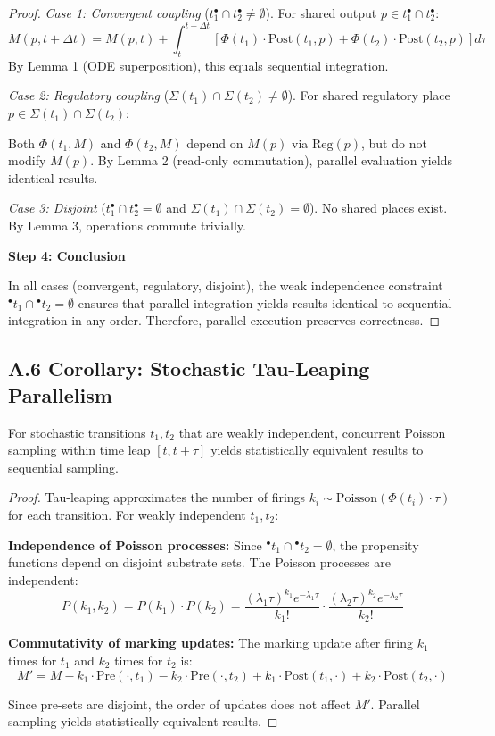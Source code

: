 \begin{proof}
\textit{Case 1: Convergent coupling} ($t_1^\bullet \cap t_2^\bullet \neq \emptyset$). For shared output $p \in t_1^\bullet \cap t_2^\bullet$:
\[
M(p, t+\Delta t) = M(p, t) + \int_t^{t+\Delta t} \left[\Phi(t_1) \cdot \text{Post}(t_1, p) + \Phi(t_2) \cdot \text{Post}(t_2, p)\right] d\tau
\]
By Lemma 1 (ODE superposition), this equals sequential integration.

\textit{Case 2: Regulatory coupling} ($\Sigma(t_1) \cap \Sigma(t_2) \neq \emptyset$). For shared regulatory place $p \in \Sigma(t_1) \cap \Sigma(t_2)$:

Both $\Phi(t_1, M)$ and $\Phi(t_2, M)$ depend on $M(p)$ via $\text{Reg}(p)$, but do not modify $M(p)$. By Lemma 2 (read-only commutation), parallel evaluation yields identical results.

\textit{Case 3: Disjoint} ($t_1^\bullet \cap t_2^\bullet = \emptyset$ and $\Sigma(t_1) \cap \Sigma(t_2) = \emptyset$). No shared places exist. By Lemma 3, operations commute trivially.

\textbf{Step 4: Conclusion}

In all cases (convergent, regulatory, disjoint), the weak independence constraint ${}^\bullet t_1 \cap {}^\bullet t_2 = \emptyset$ ensures that parallel integration yields results identical to sequential integration in any order. Therefore, parallel execution preserves correctness.
\end{proof}

\subsection*{A.6 Corollary: Stochastic Tau-Leaping Parallelism}

\begin{corollary}
For stochastic transitions $t_1, t_2$ that are weakly independent, concurrent Poisson sampling within time leap $[t, t+\tau]$ yields statistically equivalent results to sequential sampling.
\end{corollary}

\begin{proof}
Tau-leaping approximates the number of firings $k_i \sim \text{Poisson}(\Phi(t_i) \cdot \tau)$ for each transition. For weakly independent $t_1, t_2$:

\textbf{Independence of Poisson processes:} Since ${}^\bullet t_1 \cap {}^\bullet t_2 = \emptyset$, the propensity functions depend on disjoint substrate sets. The Poisson processes are independent:
\[
P(k_1, k_2) = P(k_1) \cdot P(k_2) = \frac{(\lambda_1 \tau)^{k_1} e^{-\lambda_1 \tau}}{k_1!} \cdot \frac{(\lambda_2 \tau)^{k_2} e^{-\lambda_2 \tau}}{k_2!}
\]

\textbf{Commutativity of marking updates:} The marking update after firing $k_1$ times for $t_1$ and $k_2$ times for $t_2$ is:
\[
M' = M - k_1 \cdot \text{Pre}(\cdot, t_1) - k_2 \cdot \text{Pre}(\cdot, t_2) + k_1 \cdot \text{Post}(t_1, \cdot) + k_2 \cdot \text{Post}(t_2, \cdot)
\]

Since pre-sets are disjoint, the order of updates does not affect $M'$. Parallel sampling yields statistically equivalent results.
\end{proof}

